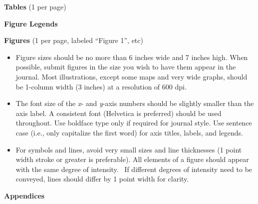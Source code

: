 \documentclass[11pt]{article}
\begin{document}

\textbf{Tables} (1 per page)

\textbf{Figure Legends}

\textbf{Figures} (1 per page, labeled ``Figure 1'', etc)

\begin{itemize}
\item
  Figure sizes should be no more than 6 inches wide and 7 inches high.
  When possible, submit figures in the size you wish to have them appear
  in the journal. Most illustrations, except some maps and very wide
  graphs, should be 1-column width (3 inches) at a resolution of 600
  dpi.
\item
  The font size of the \emph{x}- and \emph{y}-axis numbers should be
  slightly smaller than the axis label. A consistent font (Helvetica is
  preferred) should be used throughout. Use boldface type only if
  required for journal style. Use sentence case (i.e., only capitalize
  the first word) for axis titles, labels, and legends.
\item
  For symbols and lines, avoid very small sizes and line thicknesses (1
  point width stroke or greater is preferable). All elements of a figure
  should appear with the same degree of intensity.~ If different degrees
  of intensity need to be conveyed, lines should differ by 1 point width
  for clarity.
\end{itemize}

\textbf{Appendices}
\end{document}
